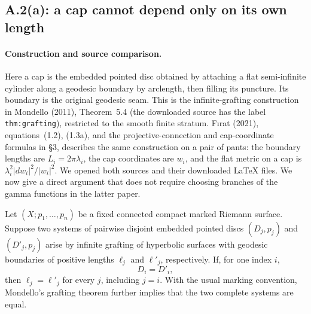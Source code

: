\subsection{A.2(a): a cap cannot depend only on its own length}

\paragraph{Construction and source comparison.}
Here a cap is the embedded pointed disc obtained by attaching a flat
semi-infinite cylinder along a geodesic boundary by arclength, then filling
its puncture. Its boundary is the original geodesic seam. This is the
infinite-grafting construction in Mondello (2011), Theorem~5.4
(the downloaded source has the label \texttt{thm:grafting}), restricted
to the smooth finite stratum. F\i rat (2021), equations~(1.2), (1.3a),
and the projective-connection and cap-coordinate formulas in \S3,
describes the same construction
on a pair of pants: the boundary lengths are $L_i=2\pi\lambda_i$,
the cap coordinates are $w_i$, and the flat metric on a cap is
$\lambda_i^2|dw_i|^2/|w_i|^2$. We opened both sources and their
downloaded \LaTeX{} files. We now give a direct argument that does not
require choosing branches of the gamma functions in the latter paper.

\begin{theorem}
\label{A:single-cap-all-lengths}
Let $(X;p_1,\ldots,p_n)$ be a fixed connected compact marked Riemann
surface. Suppose two systems of pairwise disjoint embedded pointed
discs $(D_j,p_j)$ and $(D'_j,p_j)$ arise by infinite grafting of
hyperbolic surfaces with geodesic boundaries of positive lengths
$\ell_j$ and $\ell'_j$, respectively. If, for one index $i$,
\[
 D_i=D'_i,
\]
then $\ell_j=\ell'_j$ for every $j$, including $j=i$.
With the usual marking convention,
Mondello's grafting theorem further implies that the two complete
systems are equal.
\end{theorem}

